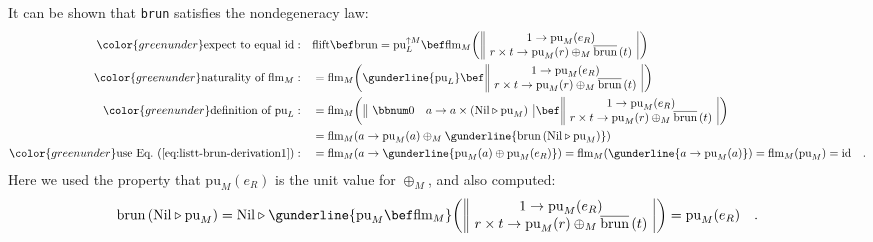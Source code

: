 It can be shown that \lstinline!brun! satisfies the nondegeneracy
law:
\begin{align*}
{\color{greenunder}\text{expect to equal }\text{id}:}\quad & \text{flift}\bef\text{brun}=\text{pu}_{L}^{\uparrow M}\bef\text{flm}_{M}\bigg(\,\begin{array}{||c|}
1\rightarrow\text{pu}_{M}(e_{R})\\
r\times t\rightarrow\text{pu}_{M}(r)\oplus_{M}\overline{\text{brun}}\,(t)
\end{array}\,\bigg)\\
{\color{greenunder}\text{naturality of }\text{flm}_{M}:}\quad & =\text{flm}_{M}\bigg(\gunderline{\text{pu}_{L}}\bef\,\begin{array}{||c|}
1\rightarrow\text{pu}_{M}(e_{R})\\
r\times t\rightarrow\text{pu}_{M}(r)\oplus_{M}\overline{\text{brun}}\,(t)
\end{array}\,\bigg)\\
{\color{greenunder}\text{definition of }\text{pu}_{L}:}\quad & =\text{flm}_{M}\bigg(\,\begin{array}{||cc|}
\bbnum 0 & a\rightarrow a\times(\text{Nil}\triangleright\text{pu}_{M})\end{array}\,\bef\,\begin{array}{||c|}
1\rightarrow\text{pu}_{M}(e_{R})\\
r\times t\rightarrow\text{pu}_{M}(r)\oplus_{M}\overline{\text{brun}}\,(t)
\end{array}\,\bigg)\\
 & =\text{flm}_{M}(a\rightarrow\text{pu}_{M}(a)\oplus_{M}\gunderline{\text{brun}\,(\text{Nil}\triangleright\text{pu}_{M})})\\
{\color{greenunder}\text{use Eq.~(\ref{eq:listt-brun-derivation1})}:}\quad & =\text{flm}_{M}(a\rightarrow\gunderline{\text{pu}_{M}(a)\oplus\text{pu}_{M}(e_{R})})=\text{flm}_{M}(\gunderline{a\rightarrow\text{pu}_{M}(a)})=\text{flm}_{M}(\text{pu}_{M})=\text{id}\quad.
\end{align*}
Here we used the property that $\text{pu}_{M}(e_{R})$ is the unit
value for $\oplus_{M}$, and also computed:
\begin{equation}
\text{brun}\,(\text{Nil}\triangleright\text{pu}_{M})=\text{Nil}\triangleright\gunderline{\text{pu}_{M}\bef\text{flm}_{M}}\bigg(\,\begin{array}{||c|}
1\rightarrow\text{pu}_{M}(e_{R})\\
r\times t\rightarrow\text{pu}_{M}(r)\oplus_{M}\overline{\text{brun}}\,(t)
\end{array}\,\bigg)=\text{pu}_{M}(e_{R})\quad.\label{eq:listt-brun-derivation1}
\end{equation}

